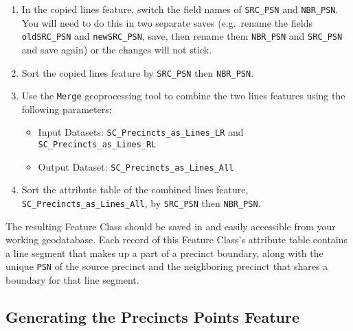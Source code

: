 \documentclass[11pt]{article}
\begin{document}
\begin{enumerate}
\item In the copied lines feature, switch the field names of \verb|SRC_PSN| and \verb|NBR_PSN|. You will need to do this in two separate saves (e.g.\ rename the fields \verb|oldSRC_PSN| and \verb|newSRC_PSN|, save, then rename them \verb|NBR_PSN| and \verb|SRC_PSN| and save again) or the changes will not stick.

\item Sort the copied lines feature by \verb|SRC_PSN| then \verb|NBR_PSN|.

\item Use the \verb|Merge| geoprocessing tool to combine the two lines features using the following parameters:
\begin{itemize}
	\item Input Datasets: \verb|SC_Precincts_as_Lines_LR| and \verb|SC_Precincts_as_Lines_RL|
	\item Output Dataset: \verb|SC_Precincts_as_Lines_All|
\end{itemize}

\item Sort the attribute table of the combined lines feature, \verb|SC_Precincts_as_Lines_All|, by \verb|SRC_PSN| then \verb|NBR_PSN|.

\end{enumerate}

The resulting Feature Class should be saved in and easily accessible from your working geodatabase. Each record of this Feature Class's attribute table contains a line segment that makes up a part of a precinct boundary, along with the unique \verb|PSN| of the source precinct and the neighboring precinct that shares a boundary for that line segment.

\subsection{Generating the Precincts Points Feature}
\end{document}
